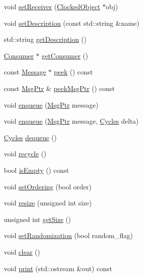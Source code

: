 \begin{DoxyCompactItemize}
\item 
void \hyperlink{classMessageBuffer_a1fbc695c465cc14aeb497a623951ba6d}{setReceiver} (\hyperlink{classClockedObject}{ClockedObject} $\ast$obj)
\item 
void \hyperlink{classMessageBuffer_a9cdbe64eebafb111a124edec55ed2340}{setDescription} (const std::string \&name)
\item 
std::string \hyperlink{classMessageBuffer_a73da75c3e5ec30855a02eae2ba824e38}{getDescription} ()
\item 
\hyperlink{classConsumer}{Consumer} $\ast$ \hyperlink{classMessageBuffer_a2417fc7252a612b5c976ceaa2d1be4f7}{getConsumer} ()
\item 
const \hyperlink{classMessage}{Message} $\ast$ \hyperlink{classMessageBuffer_a5e133f7f4632eccf4bb7145962bc89ca}{peek} () const 
\item 
const \hyperlink{classRefCountingPtr}{MsgPtr} \& \hyperlink{classMessageBuffer_add248ff5db7f0e5dac1501da94c4c83e}{peekMsgPtr} () const 
\item 
void \hyperlink{classMessageBuffer_a3e66951ea4f67cc6837309bf2c962ad4}{enqueue} (\hyperlink{classRefCountingPtr}{MsgPtr} message)
\item 
void \hyperlink{classMessageBuffer_acac1ced7e82669dca7bb95e66ca54fb9}{enqueue} (\hyperlink{classRefCountingPtr}{MsgPtr} message, \hyperlink{classCycles}{Cycles} delta)
\item 
\hyperlink{classCycles}{Cycles} \hyperlink{classMessageBuffer_af900ed471b929eca9aa2649b378086ba}{dequeue} ()
\item 
void \hyperlink{classMessageBuffer_a98102238652df03cf871c9766de96af2}{recycle} ()
\item 
bool \hyperlink{classMessageBuffer_a479432127ee77145cc19d6a2d1590821}{isEmpty} () const 
\item 
void \hyperlink{classMessageBuffer_ae93cbe20820d1830a52fceed6a4407dc}{setOrdering} (bool order)
\item 
void \hyperlink{classMessageBuffer_a80ad9f22f168208fada0b5d4b332e6a9}{resize} (unsigned int size)
\item 
unsigned int \hyperlink{classMessageBuffer_a5301d277181ca5f033a81035ff20c76b}{getSize} ()
\item 
void \hyperlink{classMessageBuffer_a746f6cbcd8fa14109bb37712f8dbd210}{setRandomization} (bool random\_\-flag)
\item 
void \hyperlink{classMessageBuffer_ac8bb3912a3ce86b15842e79d0b421204}{clear} ()
\item 
void \hyperlink{classMessageBuffer_ac55fe386a101fbae38c716067c9966a0}{print} (std::ostream \&out) const 

\end{DoxyCompactItemize}
